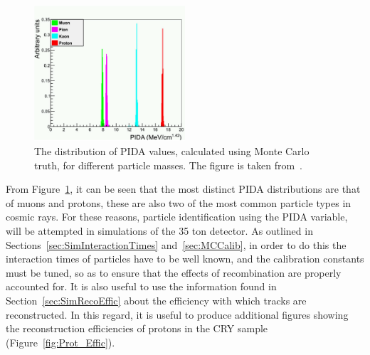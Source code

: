 \begin{figure}
  \centering
  \includegraphics[width=0.5\textwidth]{TruthPIDA}
  \caption[The distribution of PIDA values, calculated using Monte Carlo truth, for different particle masses]
          {The distribution of PIDA values, calculated using Monte Carlo truth, for different particle masses. The figure is taken from~\citep{PIDA_Paper}.}
  \label{fig:PIDA_MC}
\end{figure}

From Figure~\ref{fig:PIDA_MC}, it can be seen that the most distinct PIDA distributions are that of muons and protons, these are also two of the most common particle types in cosmic rays. For these reasons, particle identification using the PIDA variable, will be attempted in simulations of the 35 ton detector. As outlined in Sections~\ref{sec:SimInteractionTimes} and~\ref{sec:MCCalib}, in order to do this the interaction times of particles have to be well known, and the calibration constants must be tuned, so as to ensure that the effects of recombination are properly accounted for. It is also useful to use the information found in Section~\ref{sec:SimRecoEffic} about the efficiency with which tracks are reconstructed. In this regard, it is useful to produce additional figures showing the reconstruction efficiencies of protons in the CRY sample (Figure~\ref{fig:Prot_Effic}).\\

